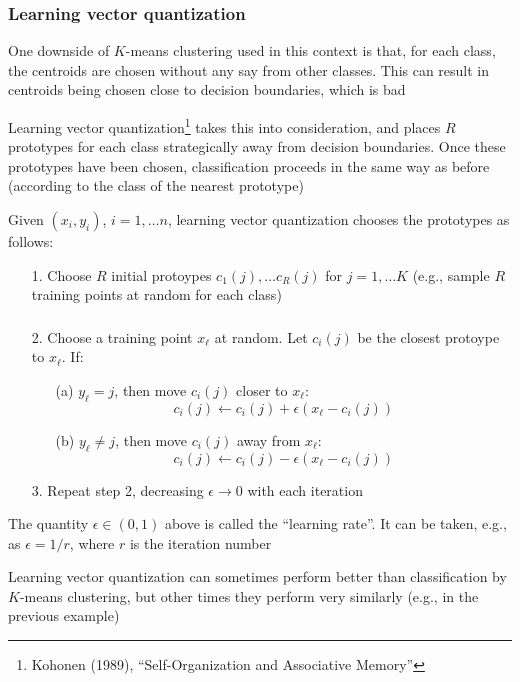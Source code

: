 \documentclass[mathserif]{beamer}
\def\red{\color[rgb]{0.8,0,0}}
\begin{document}
\begin{frame}
\frametitle{Learning vector quantization}
One downside of $K$-means clustering used in this context is that, for each 
class, the centroids are chosen without any say from other classes. This can
result in centroids being chosen close to decision boundaries, which is bad

\bigskip
{\red Learning vector quantization}\footnote{Kohonen (1989), ``Self-Organization
and Associative Memory''} takes
this into consideration, and places $R$ prototypes for each class 
strategically away from decision boundaries. Once these prototypes have been
chosen, classification proceeds in the same way as before (according to the
class of the nearest prototype)

\bigskip
Given $(x_i,y_i)$, $i=1,\ldots n$, learning vector quantization
chooses the prototypes as follows:
\begin{itemize}
\item[1.] Choose $R$ initial protoypes $c_1(j),\ldots c_R(j)$ for
$j=1,\ldots K$ (e.g., sample $R$ training points at random for each class)
\end{itemize}
\end{frame}

\begin{frame}
\frametitle{}
\smallskip
\begin{itemize}
\item[2.] Choose a training point $x_\ell$ at random. Let $c_i(j)$ be the closest
protoype to $x_\ell$. If:
\begin{itemize}
\item[(a)] $y_\ell=j$, then move $c_i(j)$ closer to $x_\ell$:
$$c_i(j) \leftarrow c_i(j) + \epsilon(x_\ell-c_i(j))$$
\item[(b)] $y_\ell\not=j$, then move $c_i(j)$ away from $x_\ell$:
$$c_i(j) \leftarrow c_i(j) - \epsilon(x_\ell-c_i(j))$$
\end{itemize}
\item[3.] Repeat step 2, decreasing $\epsilon \rightarrow 0$ with each iteration
\end{itemize}

\bigskip
The quantity $\epsilon \in (0,1)$ above is called the ``learning rate''. It 
can be taken, e.g., as $\epsilon=1/r$, where $r$ is the iteration number

\bigskip
Learning vector quantization can sometimes perform better than classification
by $K$-means clustering, but other times they perform {\red very similarly}
(e.g., in the previous example)
\end{frame}
\end{document}
